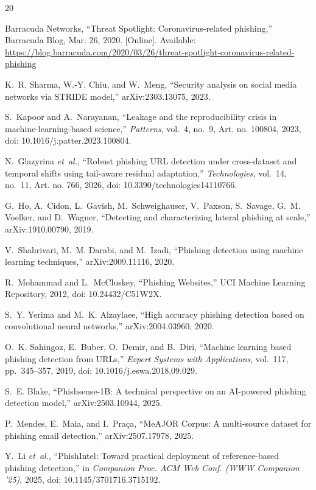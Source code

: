 \documentclass[conference]{IEEEtran}
\begin{document}
\begin{thebibliography}{20}

Barracuda Networks, ``Threat Spotlight: Coronavirus-related phishing,'' Barracuda Blog, Mar. 26, 2020. [Online]. Available: \url{https://blog.barracuda.com/2020/03/26/threat-spotlight-coronavirus-related-phishing}

K.~R. Sharma, W.-Y. Chiu, and W.~Meng, ``Security analysis on social media networks via STRIDE model,'' arXiv:2303.13075, 2023.

S.~Kapoor and A.~Narayanan, ``Leakage and the reproducibility crisis in machine-learning-based science,'' \emph{Patterns}, vol.~4, no.~9, Art. no. 100804, 2023, doi: 10.1016/j.patter.2023.100804.

N.~Glazyrina \emph{et~al.}, ``Robust phishing URL detection under cross-dataset and temporal shifts using tail-aware residual adaptation,'' \emph{Technologies}, vol.~14, no.~11, Art. no. 766, 2026, doi: 10.3390/technologies14110766.

G.~Ho, A.~Cidon, L.~Gavish, M.~Schweighauser, V.~Paxson, S.~Savage, G.~M. Voelker, and D.~Wagner, ``Detecting and characterizing lateral phishing at scale,'' arXiv:1910.00790, 2019.

V.~Shahrivari, M.~M. Darabi, and M.~Izadi, ``Phishing detection using machine learning techniques,'' arXiv:2009.11116, 2020.

R.~Mohammad and L.~McCluskey, ``Phishing Websites,'' UCI Machine Learning Repository, 2012, doi: 10.24432/C51W2X.

S.~Y. Yerima and M.~K. Alzaylaee, ``High accuracy phishing detection based on convolutional neural networks,'' arXiv:2004.03960, 2020.

O.~K. Sahingoz, E.~Buber, O.~Demir, and B.~Diri, ``Machine learning based phishing detection from URLs,'' \emph{Expert Systems with Applications}, vol.~117, pp.~345--357, 2019, doi: 10.1016/j.eswa.2018.09.029.

S.~E. Blake, ``Phishsense-1B: A technical perspective on an AI-powered phishing detection model,'' arXiv:2503.10944, 2025.

P.~Mendes, E.~Maia, and I.~Pra\c{c}a, ``MeAJOR Corpus: A multi-source dataset for phishing email detection,'' arXiv:2507.17978, 2025.

Y.~Li \emph{et~al.}, ``PhishIntel: Toward practical deployment of reference-based phishing detection,'' in \emph{Companion Proc. ACM Web Conf. (WWW Companion '25)}, 2025, doi: 10.1145/3701716.3715192.


\end{thebibliography}
\end{document}
